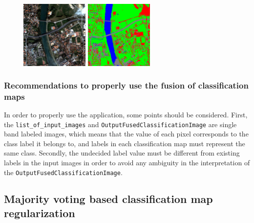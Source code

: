 \begin{figure}[!h]
  \center
  \includegraphics[width=0.3\textwidth]{../Art/MonteverdiImages/classification_chain_inputimage.jpg}
  \includegraphics[width=0.3\textwidth]{../Art/MonteverdiImages/QB_1_ortho_DS_V_P_C123456_CM.png}
  \label{fig:ClassificationMapFusionApplicationDS}
\end{figure}
 

\subsubsection{Recommendations to properly use the fusion of classification maps}

In order to properly use the  application, 
some points should be considered. First, the \verb?list_of_input_images? and 
\verb?OutputFusedClassificationImage? are single band labeled images, which means 
that the value of each pixel corresponds to the class label it belongs to, and 
labels in each classification map must represent the same class. Secondly, the 
undecided label value must be different from existing labels in the input images in 
order to avoid any ambiguity in the interpretation of the \verb?OutputFusedClassificationImage?.





\subsection{Majority voting based classification map regularization}\label{ssec:classificationmapregularization}

